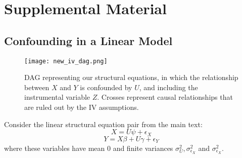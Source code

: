 \documentclass{article}
\begin{document}


%


\section{Supplemental Material}
\subsection{Confounding in a Linear Model}

\begin{figure}[h!]
	\begin{center}
		\texttt{[image: new\_iv\_dag.png]}
	\end{center}
	\caption{DAG representing our structural equations, in which the relationship between $X$ and $Y$ is confounded by $U$, and including the instrumental variable $Z$. Crosses represent causal relationships that are ruled out by the IV assumptions.}
	\label{fig:iv_setup}
\end{figure}

Consider the linear structural equation pair from the main text:
$$X = U\psi + \epsilon_{X}$$
$$Y = X\beta + U\gamma + \epsilon_{Y}$$
where these variables have mean 0 and finite variances $\sigma^2_U, \sigma^2_{\epsilon_{X}}$ and $\sigma^2_{\epsilon_{X}}$.
\end{document}
